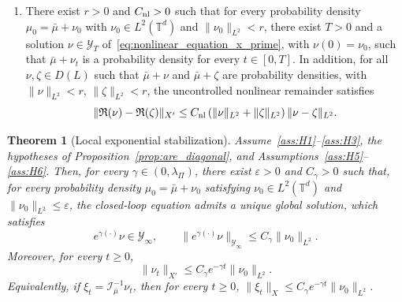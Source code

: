\documentclass[11pt]{article}
\numberwithin{equation}{section}
\newtheorem{theorem}{Theorem}[section]
\theoremstyle{definition}
\newcommand{\T}{\mathbb{T}}
\newcommand{\rieszmap}[1][\mu]{\mathcal{I}_{#1}}
\begin{document}
\begin{enumerate}[label=(H\arabic*),ref=(H\arabic*),start=6]
    \item\label{ass:H6} There exist $r > 0$ and $C_{\rm nl} > 0$ such that for every probability density $\mu_0 = \bar\mu + \nu_0$ with $\nu_0 \in L^2(\T^d)$ and $\|\nu_0\|_{L^2} < r$, there exist $T > 0$ and a solution $\nu \in \mathcal{Y}_T$ of~\eqref{eq:nonlinear_equation_x_prime}, with $\nu(0) = \nu_0$, such that $\bar\mu + \nu_t$ is a probability density for every $t \in [0,T]$.
    In addition, for all $\nu, \zeta \in D(L)$ such that
    $\bar\mu + \nu$ and $\bar\mu + \zeta$ are probability densities, with $\|\nu\|_{L^2} < r$, $\|\zeta\|_{L^2} < r$, the uncontrolled nonlinear remainder satisfies
    \[
    \|\mathfrak{R}(\nu) - \mathfrak{R}(\zeta)\|_{X'} \le C_{\rm nl} \left(\|\nu\|_{L^2} + \|\zeta\|_{L^2} \right) \|\nu - \zeta\|_{L^2}.
    \]
\end{enumerate}

\begin{theorem}[Local exponential stabilization]
\label{thm:local_stab}
    Assume~\ref{ass:H1}--\ref{ass:H3}, the hypotheses of Proposition~\ref{prop:are_diagonal}, and Assumptions~\ref{ass:H5}--\ref{ass:H6}.
    Then, for every $\gamma \in (0,\lambda_\Pi)$, there exist $\varepsilon > 0$ and $C_\gamma > 0$ such that, for every probability density $\mu_0 = \bar\mu + \nu_0$ satisfying $\nu_0 \in L^2(\T^d)$ and $\|\nu_0\|_{L^2} \le \varepsilon$, the closed-loop equation admits a unique global solution, which satisfies
    \[
    e^{\gamma(\cdot)}\nu \in \mathcal{Y}_\infty, \qquad \|e^{\gamma(\cdot)}\nu\|_{\mathcal{Y}_\infty} \le C_\gamma \|\nu_0\|_{L^2}.
    \]
    Moreover, for every $t \ge 0$,
    \[
    \|\nu_t\|_{X'} \le C_\gamma e^{-\gamma t}\|\nu_0\|_{L^2}.
    \]
    Equivalently, if $\xi_t = \rieszmap[\bar\mu]^{-1}\nu_t$, then for every $t \ge 0$, $\|\xi_t\|_X \le C_\gamma e^{-\gamma t}\|\nu_0\|_{L^2}$.
\end{theorem}
\end{document}
